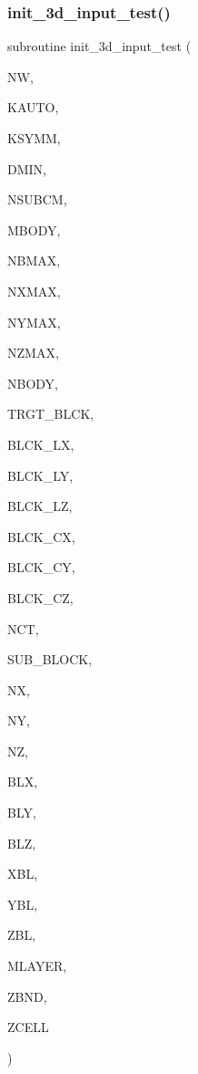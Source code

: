 \subsubsection{\texorpdfstring{init\+\_\+3d\+\_\+input\+\_\+test()}{init\_3d\_input\_test()}}
{\footnotesize\ttfamily subroutine init\+\_\+3d\+\_\+input\+\_\+test (\begin{DoxyParamCaption}\item[{integer}]{NW,  }\item[{integer}]{K\+A\+U\+TO,  }\item[{integer}]{K\+S\+Y\+MM,  }\item[{real}]{D\+M\+IN,  }\item[{integer}]{N\+S\+U\+B\+CM,  }\item[{integer}]{M\+B\+O\+DY,  }\item[{integer}]{N\+B\+M\+AX,  }\item[{integer}]{N\+X\+M\+AX,  }\item[{integer}]{N\+Y\+M\+AX,  }\item[{integer}]{N\+Z\+M\+AX,  }\item[{integer}]{N\+B\+O\+DY,  }\item[{integer}]{T\+R\+G\+T\+\_\+\+B\+L\+CK,  }\item[{real, dimension(trgt\+\_\+blck)}]{B\+L\+C\+K\+\_\+\+LX,  }\item[{real, dimension(trgt\+\_\+blck)}]{B\+L\+C\+K\+\_\+\+LY,  }\item[{real, dimension(trgt\+\_\+blck)}]{B\+L\+C\+K\+\_\+\+LZ,  }\item[{real, dimension(trgt\+\_\+blck)}]{B\+L\+C\+K\+\_\+\+CX,  }\item[{real, dimension(trgt\+\_\+blck)}]{B\+L\+C\+K\+\_\+\+CY,  }\item[{real, dimension(trgt\+\_\+blck)}]{B\+L\+C\+K\+\_\+\+CZ,  }\item[{integer, dimension(mbody)}]{N\+CT,  }\item[{integer, dimension(mbody)}]{S\+U\+B\+\_\+\+B\+L\+O\+CK,  }\item[{integer, dimension(nbmax,mbody)}]{NX,  }\item[{integer, dimension(nbmax,mbody)}]{NY,  }\item[{integer, dimension(nbmax,mbody)}]{NZ,  }\item[{real, dimension(nbmax,mbody)}]{B\+LX,  }\item[{real, dimension(nbmax,mbody)}]{B\+LY,  }\item[{real, dimension(nbmax,mbody)}]{B\+LZ,  }\item[{real, dimension(nbmax,mbody)}]{X\+BL,  }\item[{real, dimension(nbmax,mbody)}]{Y\+BL,  }\item[{real, dimension(nbmax,mbody)}]{Z\+BL,  }\item[{integer}]{M\+L\+A\+Y\+ER,  }\item[{real, dimension(0\+:mlayer)}]{Z\+B\+ND,  }\item[{real, dimension(nzmax,nbmax,mbody)}]{Z\+C\+E\+LL }\end{DoxyParamCaption})}

